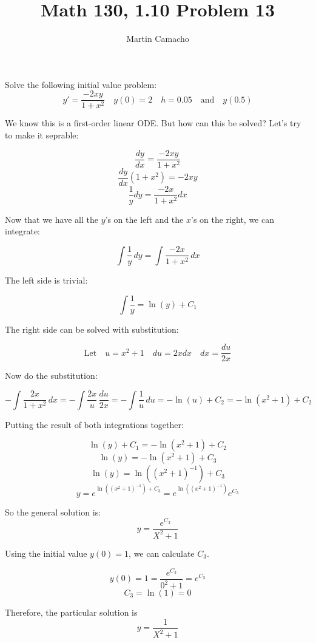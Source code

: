 \documentclass{article}
\begin{document}
\title{Math 130, 1.10 Problem 13}

\author{Martin Camacho}
\maketitle

Solve the following initial value problem:
\[ 
  y' = \frac{-2xy}{1 + x^2} \quad
  y(0) = 2  \quad h = 0.05 \quad \textrm{and} \quad y(0.5)
\]

We know this is a first-order linear ODE. But how can this be solved? 
Let's try to make it seprable:

\[ \frac{dy}{dx} = \frac{-2xy}{1 + x^2} \]
\[ \frac{dy}{dx}(1 + x^2) = -2xy \]
\[ \frac{1}{y}dy = \frac{-2x}{1 + x^2}dx \]

Now that we have all the \(y\)'s on the left and the \(x\)'s on the right, we can integrate:

\[ \int \frac{1}{y} \,dy = \int \frac{-2x}{1 + x^2} \,dx \]

The left side is trivial:

\[ \int \frac{1}{y} = \ln(y) + C_1\]

The right side can be solved with substitution:

\[\textrm{Let} \quad u = x^2 + 1 \quad du = 2xdx \quad dx = \frac{du}{2x}\]

Now do the substitution:

\[-\int \frac{2x}{1 + x^2} \,dx = -\int \frac{2x}{u} \,\frac{du}{2x} = -\int \frac{1}{u} \,du = -\ln(u) + C_2 = -\ln(x^2 + 1) + C_2\]

Putting the result of both integrations together:

\[ \ln(y) + C_1 = -\ln(x^2 + 1) + C_2\]
\[ \ln(y) = -\ln(x^2 + 1) + C_3\]
\[ \ln(y) = \ln((x^2 + 1)^{-1}) + C_3\]
\[ y = e^{\ln((x^2 + 1)^{-1}) + C_3} = e^{\ln((x^2 + 1)^{-1})}e^{C_3}\]

So the general solution is:
\[ y = \frac{e^{C_3}}{X^2 + 1}\]

Using the initial value  \(y(0) = 1\), we can calculate  \(C_3\).

\[ y(0) = 1 = \frac{e^{C_3}}{0^2 + 1} = e^{C_3}\]
\[ C_3 = \ln(1) = 0\]

Therefore, the particular solution is
\[ y = \frac{1}{X^2 + 1}\]
\end{document}
